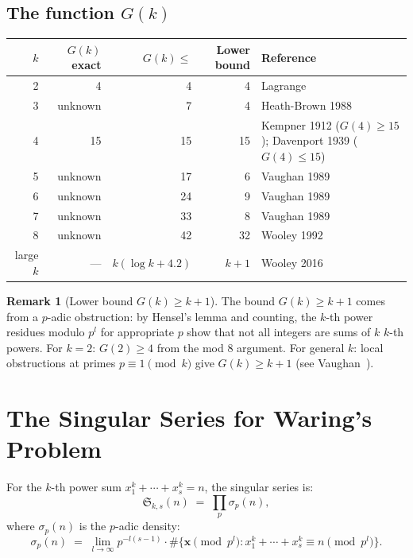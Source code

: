 \documentclass[12pt,a4paper]{amsart}
\theoremstyle{definition}
\newtheorem{remark}[theorem]{Remark}
\begin{document}
\subsection{The function $G(k)$}

\begin{center}
\begin{tabular}{rrrrl}
\toprule
$k$ & $G(k)$ exact & $G(k) \leq$ & Lower bound & Reference \\
\midrule
2 & 4 & 4 & 4 & Lagrange \\
3 & unknown & 7 & 4 & Heath-Brown 1988 \\
4 & 15 & 15 & 15 & Kempner 1912 ($G(4)\!\geq\!15$); Davenport 1939 ($G(4)\!\leq\!15$) \\
5 & unknown & 17 & 6 & Vaughan 1989 \\
6 & unknown & 24 & 9 & Vaughan 1989 \\
7 & unknown & 33 & 8 & Vaughan 1989 \\
8 & unknown & 42 & 32 & Wooley 1992 \\
large $k$ & — & $k(\log k + 4.2)$ & $k+1$ & Wooley 2016 \\
\bottomrule
\end{tabular}
\end{center}

\begin{remark}[Lower bound $G(k) \geq k+1$]
  The bound $G(k) \geq k+1$ comes from a $p$-adic obstruction:
  by Hensel's lemma and counting, the $k$-th power residues modulo $p^l$
  for appropriate $p$ show that not all integers are sums of $k$ $k$-th
  powers.  For $k = 2$: $G(2) \geq 4$ from the mod 8 argument.
  For general $k$: local obstructions at primes $p \equiv 1 \pmod k$
  give $G(k) \geq k + 1$ (see Vaughan~\cite{Vaughan1981}).
\end{remark}

\section{The Singular Series for Waring's Problem}
\label{sec:singular_waring}

For the $k$-th power sum $x_1^k + \cdots + x_s^k = n$, the singular
series is:
\[
  \mathfrak{S}_{k,s}(n)
  \;=\; \prod_p \sigma_p(n),
\]
where $\sigma_p(n)$ is the $p$-adic density:
\[
  \sigma_p(n) \;=\; \lim_{l \to \infty} p^{-l(s-1)}
                    \cdot \#\bigl\{\mathbf{x} \pmod{p^l} :
                           x_1^k + \cdots + x_s^k \equiv n \pmod{p^l}\bigr\}.
\]
\end{document}
